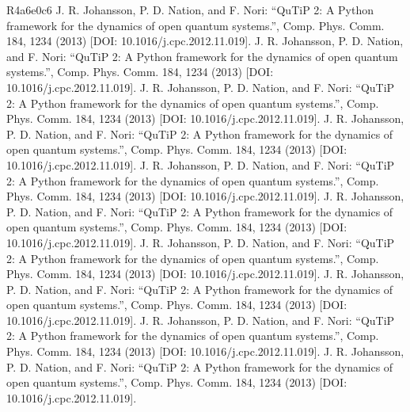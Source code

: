 \documentclass[letterpaper,10pt,english]{sphinxmanual}
\begin{document}
\begin{sphinxthebibliography}{R4a6e0c6}
J. R. Johansson, P. D. Nation, and F. Nori: “QuTiP 2: A Python framework
for the dynamics of open quantum systems.”, Comp. Phys. Comm. 184, 1234
(2013) {[}DOI: 10.1016/j.cpc.2012.11.019{]}.
J. R. Johansson, P. D. Nation, and F. Nori: “QuTiP 2: A Python framework
for the dynamics of open quantum systems.”, Comp. Phys. Comm. 184, 1234
(2013) {[}DOI: 10.1016/j.cpc.2012.11.019{]}.
J. R. Johansson, P. D. Nation, and F. Nori: “QuTiP 2: A Python framework
for the dynamics of open quantum systems.”, Comp. Phys. Comm. 184, 1234
(2013) {[}DOI: 10.1016/j.cpc.2012.11.019{]}.
J. R. Johansson, P. D. Nation, and F. Nori: “QuTiP 2: A Python framework
for the dynamics of open quantum systems.”, Comp. Phys. Comm. 184, 1234
(2013) {[}DOI: 10.1016/j.cpc.2012.11.019{]}.
J. R. Johansson, P. D. Nation, and F. Nori: “QuTiP 2: A Python framework
for the dynamics of open quantum systems.”, Comp. Phys. Comm. 184, 1234
(2013) {[}DOI: 10.1016/j.cpc.2012.11.019{]}.
J. R. Johansson, P. D. Nation, and F. Nori: “QuTiP 2: A Python framework
for the dynamics of open quantum systems.”, Comp. Phys. Comm. 184, 1234
(2013) {[}DOI: 10.1016/j.cpc.2012.11.019{]}.
J. R. Johansson, P. D. Nation, and F. Nori: “QuTiP 2: A Python framework
for the dynamics of open quantum systems.”, Comp. Phys. Comm. 184, 1234
(2013) {[}DOI: 10.1016/j.cpc.2012.11.019{]}.
J. R. Johansson, P. D. Nation, and F. Nori: “QuTiP 2: A Python framework
for the dynamics of open quantum systems.”, Comp. Phys. Comm. 184, 1234
(2013) {[}DOI: 10.1016/j.cpc.2012.11.019{]}.
J. R. Johansson, P. D. Nation, and F. Nori: “QuTiP 2: A Python framework
for the dynamics of open quantum systems.”, Comp. Phys. Comm. 184, 1234
(2013) {[}DOI: 10.1016/j.cpc.2012.11.019{]}.
J. R. Johansson, P. D. Nation, and F. Nori: “QuTiP 2: A Python framework
for the dynamics of open quantum systems.”, Comp. Phys. Comm. 184, 1234
(2013) {[}DOI: 10.1016/j.cpc.2012.11.019{]}.

\end{sphinxthebibliography}
\end{document}
